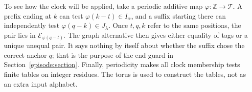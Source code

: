 To see how the clock will be applied, take a periodic additive map
$\varphi:\mathbb Z\to\mathcal T$. A prefix ending at $k$ can test
$\varphi(k-t)\in I_\alpha$, and a suffix starting there can independently
test $\varphi(q-k)\in J_\lambda$. Once $t,q,k$ refer to the same
positions, the pair lies in $\mathcal E_{\varphi(q-t)}$. The graph
alternative then gives either equality of tags or a unique unequal pair.
It says nothing by itself about whether the suffix chose the correct
anchor $q$; that is the purpose of the end guard in
Section~\ref{episode:section}. Finally, periodicity makes all clock
membership tests finite tables on integer residues. The torus is used
to construct the tables, not as an extra input alphabet.
